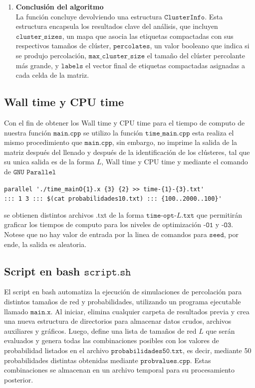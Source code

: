 \documentclass[12pt,a4paper]{article}
\begin{document}
\begin{enumerate}[label=\textbf{\arabic*)}, ref=\arabic*)]
    \item \textbf{Conclusión del algoritmo}\\
    La función concluye devolviendo una estructura $\texttt{ClusterInfo}$. Esta estructura encapsula los resultados clave del análisis, que incluyen $\texttt{cluster\_sizes}$, un mapa que asocia las etiquetas compactadas con sus respectivos tamaños de clúster, $\texttt{percolates}$, un valor booleano que indica si se produjo percolación, $\texttt{max\_cluster\_size}$ el tamaño del clúster percolante más grande, y $\texttt{labels}$ el vector final de etiquetas compactadas asignadas a cada celda de la matriz.
\end{enumerate}

\subsection{Wall time y CPU time}
\label{WtCPUt}
Con el fin de obtener los Wall time y CPU time para el tiempo de computo de nuestra función $\texttt{main.cpp}$ se utilizo la función $\texttt{time\_main.cpp}$ esta realiza el mismo procedimiento que $\texttt{main.cpp}$, sin embargo, no imprime la salida de la matriz después del llenado y después de la identificación de los clústeres, tal que su unica salida es de la forma $L$, Wall time y CPU time y mediante el comando de $\texttt{GNU Parallel}$

\begin{center}
\verb|parallel './time_mainO{1}.x {3} {2} >> time-{1}-{3}.txt'|\\
\verb|::: 1 3 ::: $(cat probabilidades10.txt) ::: {100..2000..100}'|
\end{center}

se obtienen distintos archivos .txt de la forma $\texttt{time-opt-$L$.txt}$ que permitirán graficar los tiempos de computo para los niveles de optimización $\texttt{-O1}$ y $\texttt{-O3}$. Notese que no hay valor de entrada por la linea de comandos para $\texttt{seed}$, por ende, la salida es aleatoria.


\subsection{Script en bash $\texttt{script.sh}$}

El script en bash automatiza la ejecución de simulaciones de percolación para distintos tamaños de red y probabilidades, utilizando un programa ejecutable llamado $\texttt{main.x}$. Al iniciar, elimina cualquier carpeta de resultados previa y crea una nueva estructura de directorios para almacenar datos crudos, archivos auxiliares y gráficos. Luego, define una lista de tamaños de red $L$ que serán evaluados y genera todas las combinaciones posibles con los valores de probabilidad listados en el archivo $\texttt{probabilidades50.txt}$, es decir, mediante 50 probabilidades distintas obtenidas mediante $\texttt{probvalues.cpp}$. Estas combinaciones se almacenan en un archivo temporal para su procesamiento posterior.\\
 
\end{document}

